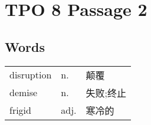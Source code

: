 \section{TPO 8 Passage 2}

\subsection{Words}

\begin{tabular}{lll}
    disruption & n.   & 颠覆    \\
    demise     & n.   & 失败;终止 \\
    frigid     & adj. & 寒冷的   \\
\end{tabular}

